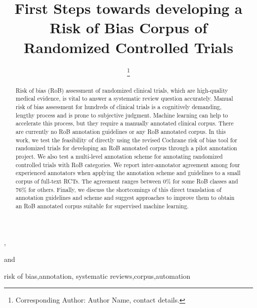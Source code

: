 \documentclass{IOS-Book-Article}
\def\hb{\hbox to 11.5 cm{}}
\begin{document}
\pagestyle{headings}
\def\thepage{}
\begin{frontmatter}              %


\title{First Steps towards developing a Risk of Bias Corpus of Randomized Controlled Trials}

\markboth{}{April 2022\hb}

\author[A]{ %
\thanks{Corresponding Author: Author Name, contact details.}},
\author[B]{ }
and
\author[B]{ }

\address[A]{Short Affiliation of First Author}
\address[B]{Short Affiliation of Second Author and Third Author}

\begin{abstract}
Risk of bias (RoB) assessment of randomized clinical trials, which are high-quality medical evidence, is vital to answer a systematic review question accurately. 
Manual risk of bias assessment for hundreds of clinical trials is a cognitively demanding, lengthy process and is prone to subjective judgment. 
Machine learning can help to accelerate this process, but they require a manually annotated clinical corpus.
There are currently no  RoB annotation guidelines or any RoB annotated corpus.
In this work, we test the feasibility of directly using the revised Cochrane risk of bias tool for randomized trials for developing an RoB annotated corpus through a pilot annotation project. 
We also test a multi-level annotation scheme for annotating randomized controlled trials with RoB categories.
We report inter-annotator agreement among four experienced annotators when applying the annotation scheme and guidelines to a small corpus of full-text RCTs.
The agreement ranges between 0\% for some RoB classes and 76\% for others.
Finally, we discuss the shortcomings of this direct translation of annotation guidelines and scheme and suggest approaches to improve them to obtain an RoB annotated corpus suitable for supervised machine learning.
\end{abstract}

\begin{keyword}
risk of bias\sep annotation\sep
systematic reviews\sep corpus\sep automation
\end{keyword}
\end{frontmatter}
\markboth{April 2022\hb}{April 2022\hb}
\end{document}
